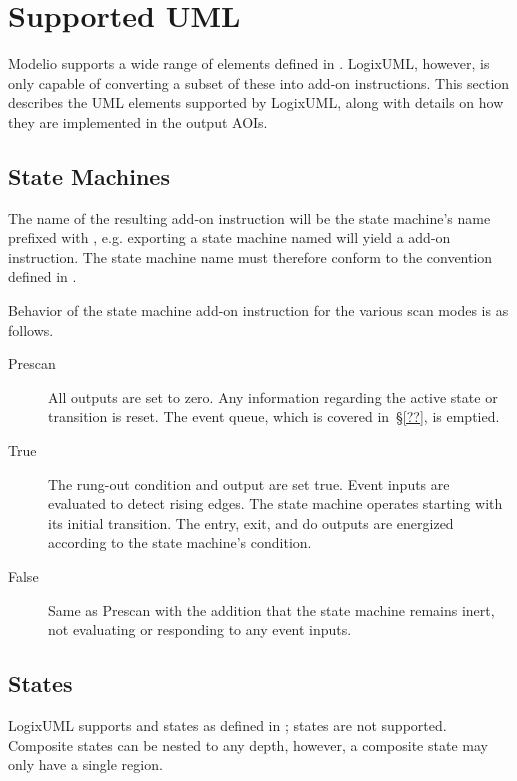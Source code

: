 \section{Supported UML}

Modelio supports a wide range of elements defined in \textcite{OMGUML}.
LogixUML, however, is only capable of converting a subset of these into
add-on instructions. This section describes the UML elements supported
by LogixUML, along with details on how they are implemented in the output
AOIs.

\subsection{State Machines}

The name of the resulting add-on instruction will be the state machine's
name prefixed with , e.g. exporting a state
machine named  will yield a
 add-on instruction.
The state machine name must therefore conform to the convention defined
in \textcite[Chapter~2]{AOI}.

Behavior of the state machine add-on instruction for the various scan
modes is as follows.

\begin{description}
  \item[Prescan] All outputs are set to zero. Any information regarding
    the active state or transition is reset. The event queue, which is
    covered in~\S\ref{??}, is emptied.

  \item[True] The rung-out condition and  output are set
    true. Event inputs are evaluated to detect rising edges. The state machine
    operates starting with its initial transition. The entry, exit, and
    do outputs are energized according to the state machine's condition.

  \item[False] Same as Prescan with the addition that the state machine
    remains inert, not evaluating or responding to any event inputs.
\end{description}


\subsection{States}
\label{ss:states}

LogixUML supports  and
 states as defined in
\textcite[\S14.2.3.4.1]{OMGUML};  states are
not supported. Composite states can be nested to any depth, however, a
composite state may only have a single region.

